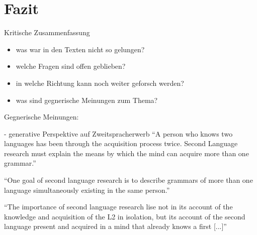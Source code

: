 \section{Fazit}

\begin{comment}
    * Einleitung und Fazit müssen zusammenpassen.
    * sind die Erkenntnisse im Fazit aus der Arbeit ableitbar?
    * Vorgehensweise zusammenfassen
\end{comment}

Kritische Zusammenfassung
\begin{itemize}
    \item was war in den Texten nicht so gelungen?
    \item welche Fragen sind offen geblieben?
    \item in welche Richtung kann noch weiter geforsch werden?
    \item was sind gegnerische Meinungen zum Thema?
\end{itemize}

Gegnerische Meinungen:

\cite{Cook93} - generative Perspektive auf Zweitspracherwerb
``A person who knows two languages has been through the acquisition process twice.
Second Language research must explain the means by which the mind can acquire more than one grammar.''

``One goal of second language research is to describe grammars of more than one language simultaneously existing in the same person.''

``The importance of second language research lise not in its account of the knowledge and acquisition of the L2 in isolation, but its account of the second language present and acquired in a mind that already knows a first [...]''
